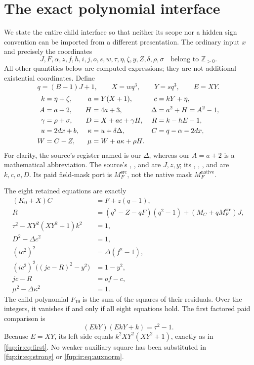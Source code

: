 \documentclass[11pt,letterpaper]{article}
\theoremstyle{definition}\newtheorem{definition}[theorem]{Definition}
\theoremstyle{remark}\newtheorem{remark}[theorem]{Remark}
\newcommand{\pos}{\mathbb Z_{>0}}
\newcommand{\code}[1]{\texttt{\detokenize{#1}}}
\newcommand{\MFnat}{M_{F}^{\mathrm{native}}}
\newcommand{\MFsrc}{M_F^{\mathrm{src}}}
\newcommand{\MC}{M_C}
\begin{document}
\section{The exact polynomial interface}\label{fup:ir:sec:interface}
We state the entire child interface so that neither its scope nor a hidden sign convention can be imported from a different presentation. The ordinary input $x$ and precisely the coordinates
\begin{equation}\label{fup:ir:eq:witnesses}
 J,F,\alpha,z,f,h,i,j,o,s,w,\tau,\eta,\zeta,y,Z,\delta,\rho,\sigma
 \quad\text{belong to }\pos.
\end{equation}
All other quantities below are computed expressions; they are not additional existential coordinates. Define
\begin{equation}\label{fup:ir:eq:defscale}
 q=(B-1)J+1,\qquad X=wq^3,\qquad Y=sq^3,\qquad E=XY.
\end{equation}
\begin{align}
 k&=\eta+\zeta,&a&=Y(X+1),&c&=kY+\eta,\label{fup:ir:eq:defmain}\\
 A&=a+2,&H&=4a+3,&\Delta&=a^2+H=A^2-1,\notag\\
 \gamma&=\rho+\sigma,&D&=X+ac+\gamma H,&R&=k-hE-1,\label{fup:ir:eq:defrest}\\
 u&=2dx+b,&\kappa&=u+\delta\Delta,&C&=q-\alpha-2dx,\label{fup:ir:eq:definput}\\
 W&=C-Z,&\mu&=W+a\kappa+\rho H.&&\notag
\end{align}
For clarity, the source's register named \code{A} is our $\Delta$, whereas our $A=a+2$ is a mathematical abbreviation. The source's \code{Jrep}, \code{zquot}, and \code{y_aux} are $J,z,y$; its \code{R10b}, \code{R10a}, \code{R12}, and \code{R14} are $k,c,a,D$. Its paid field-mask port is $\MFsrc$, not the native mask $\MFnat$.

The eight retained equations are exactly
\begin{align}
 (K_0+X)C&=F+z(q-1),\label{fup:ir:eq:transport}\\
 R&=(q^2-Z-qF)(q^2-1)+(\MC+q\MFsrc)J,\label{fup:ir:eq:packing}\\
 \tau^2-XY^2(XY^2+1)k^2&=1,\label{fup:ir:eq:first}\\
 D^2-\Delta c^2&=1,\label{fup:ir:eq:mainnorm}\\
 (ic^2)^2&=\Delta(f^2-1),\label{fup:ir:eq:strong}\\
 (ic^2)^2\big((jc-R)^2-y^2\big)&=1-y^2,\label{fup:ir:eq:auxnorm}\\
 jc-R&=of-c,\label{fup:ir:eq:auxlinear}\\
 \mu^2-\Delta\kappa^2&=1.\label{fup:ir:eq:inputnorm}
\end{align}
The child polynomial $F_{19}$ is the sum of the squares of their residuals. Over the integers, it vanishes if and only if all eight equations hold. The first factored paid comparison is
\[
 (EkY)(EkY+k)=\tau^2-1.
\]
Because $E=XY$, its left side equals $k^2XY^2(XY^2+1)$, exactly as in \eqref{fup:ir:eq:first}. No weaker auxiliary square has been substituted in \eqref{fup:ir:eq:strong} or \eqref{fup:ir:eq:auxnorm}.
\end{document}
